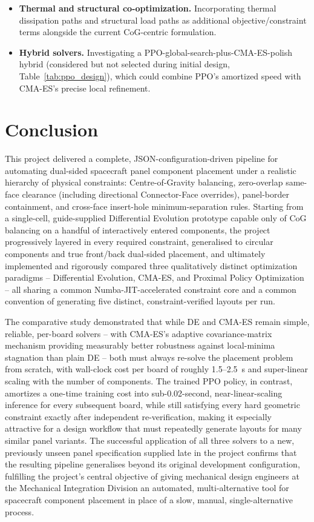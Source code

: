 \documentclass[11pt,a4paper,oneside]{report}
\begin{document}
\begin{itemize}
    \item \textbf{Thermal and structural co-optimization.} Incorporating thermal dissipation paths and structural load paths as additional objective/constraint terms alongside the current CoG-centric formulation.
    
    \item \textbf{Hybrid solvers.} Investigating a PPO-global-search-plus-CMA-ES-polish hybrid (considered but not selected during initial design, Table~\ref{tab:ppo_design}), which could combine PPO's amortized speed with CMA-ES's precise local refinement.
\end{itemize}
\chapter{Conclusion}
\label{chap:conclusion}
This project delivered a complete, JSON-configuration-driven pipeline for automating dual-sided spacecraft panel component placement under a realistic hierarchy of physical constraints: Centre-of-Gravity balancing, zero-overlap same-face clearance (including directional Connector-Face overrides), panel-border containment, and cross-face insert-hole minimum-separation rules. Starting from a single-cell, guide-supplied Differential Evolution prototype capable only of CoG balancing on a handful of interactively entered components, the project progressively layered in every required constraint, generalised to circular components and true front/back dual-sided placement, and ultimately implemented and rigorously compared three qualitatively distinct optimization paradigms -- Differential Evolution, CMA-ES, and Proximal Policy Optimization -- all sharing a common Numba-JIT-accelerated constraint core and a common convention of generating five distinct, constraint-verified layouts per run.

The comparative study demonstrated that while DE and CMA-ES remain simple, reliable, per-board solvers -- with CMA-ES's adaptive covariance-matrix mechanism providing measurably better robustness against local-minima stagnation than plain DE -- both must always re-solve the placement problem from scratch, with wall-clock cost per board of roughly 1.5--2.5~s and super-linear scaling with the number of components. The trained PPO policy, in contrast, amortizes a one-time training cost into sub-0.02-second, near-linear-scaling inference for every subsequent board, while still satisfying every hard geometric constraint exactly after independent re-verification, making it especially attractive for a design workflow that must repeatedly generate layouts for many similar panel variants. The successful application of all three solvers to a new, previously unseen panel specification supplied late in the project confirms that the resulting pipeline generalises beyond its original development configuration, fulfilling the project's central objective of giving mechanical design engineers at the Mechanical Integration Division an automated, multi-alternative tool for spacecraft component placement in place of a slow, manual, single-alternative process.
\end{document}
